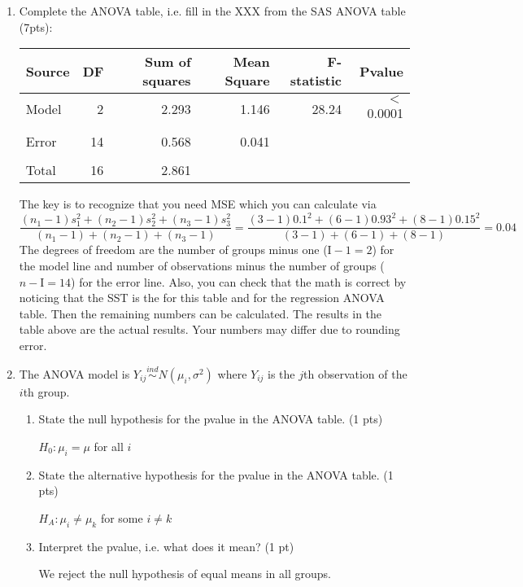 \documentclass[10pt]{article}
\newcommand{\bigbrk}{\vspace*{2in}}
\newcommand{\smallbrk}{\vspace*{.3in}}
\newcommand{\correct}[1]{{\color{red} #1}}
\newcommand{\shortcorrect}[1]{{\color{red} #1}}
\newcommand{\longcorrect}[2][\bigbrk]{{\color{red} #2}}
\newcommand{\correct}[1]{}
\newcommand{\shortcorrect}[1]{{\phantom{33.33}}}
\newcommand{\longcorrect}[2][\bigbrk]{#1}
\begin{document}
\begin{enumerate}
\item Complete the ANOVA table, i.e. fill in the XXX from the SAS ANOVA table  (7pts):

{\Large
\begin{center}
\begin{tabular}{lrrrrr}
Source & DF & Sum of squares & Mean Square & F-statistic & Pvalue \\
\hline
Model & \correct{2} & \correct{2.293} & \correct{1.146} & 28.24 & $<$0.0001 \\ \\
Error & \correct{14} & \correct{0.568} & \correct{0.041} &  & \\ \\
\hline 
Total & \correct{16} & \correct{2.861}
\end{tabular}
\end{center}
}

\longcorrect{The key is to recognize that you need MSE which you can calculate via 
\[ \frac{(n_1-1)s_1^2 + (n_2-1)s_2^2+(n_3-1)s_3^2}{(n_1-1)+(n_2-1)+(n_3-1)} = \frac{(3-1)0.1^2 + (6-1)0.93^2+(8-1)0.15^2}{(3-1)+(6-1)+(8-1)}=0.04 \]
The degrees of freedom are the number of groups minus one ($\mathrm{I}-1=2$) for the model line and number of observations minus the number of groups ($n-\mathrm{I}=14$) for the error line. Also, you can check that the math is correct by noticing that the SST is the for this table and for the regression ANOVA table. Then the remaining numbers can be calculated. The results in the table above are the actual results. Your numbers may differ due to rounding error.}

\item The ANOVA model is $Y_{ij} \stackrel{ind}{\sim} N(\mu_i,\sigma^2)$ where $Y_{ij}$ is the $j$th observation of the $i$th group.
\begin{enumerate}
\item State the null hypothesis for the pvalue in the ANOVA table. (1 pts)

\shortcorrect{$H_0:\mu_i=\mu$ for all $i$}\smallbrk

\item State the alternative hypothesis for the pvalue in the ANOVA table. (1 pts)

\shortcorrect{$H_A:\mu_i\ne \mu_k$ for some $i\ne k$}\smallbrk

\item Interpret the pvalue, i.e. what does it mean? (1 pt)

\shortcorrect{We reject the null hypothesis of equal means in all groups.}

\end{enumerate}

\end{enumerate}
\end{document}

